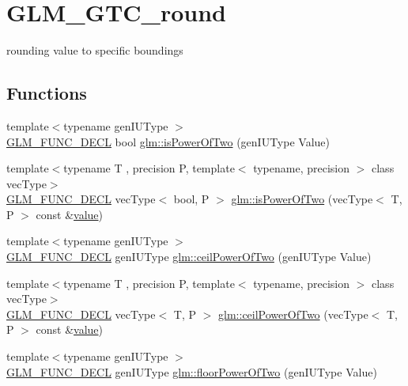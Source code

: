 \hypertarget{group__gtc__round}{}\section{G\+L\+M\+\_\+\+G\+T\+C\+\_\+round}
\label{group__gtc__round}


rounding value to specific boundings  


\subsection*{Functions}
\begin{DoxyCompactItemize}
\item 
{\footnotesize template$<$typename gen\+I\+U\+Type $>$ }\\\mbox{\hyperlink{setup_8hpp_ab2d052de21a70539923e9bcbf6e83a51}{G\+L\+M\+\_\+\+F\+U\+N\+C\+\_\+\+D\+E\+CL}} bool \mbox{\hyperlink{group__gtc__round_gaebf826fbb6e0a70eeaab0792d89b25ec}{glm\+::is\+Power\+Of\+Two}} (gen\+I\+U\+Type Value)
\item 
{\footnotesize template$<$typename T , precision P, template$<$ typename, precision $>$ class vec\+Type$>$ }\\\mbox{\hyperlink{setup_8hpp_ab2d052de21a70539923e9bcbf6e83a51}{G\+L\+M\+\_\+\+F\+U\+N\+C\+\_\+\+D\+E\+CL}} vec\+Type$<$ bool, P $>$ \mbox{\hyperlink{group__gtc__round_gad454e4c8d8cd73ddc7de855f733a1465}{glm\+::is\+Power\+Of\+Two}} (vec\+Type$<$ T, P $>$ const \&\mbox{\hyperlink{glad_8h_a03aff08f73d7fde3d1a08e0abd8e84fa}{value}})
\item 
{\footnotesize template$<$typename gen\+I\+U\+Type $>$ }\\\mbox{\hyperlink{setup_8hpp_ab2d052de21a70539923e9bcbf6e83a51}{G\+L\+M\+\_\+\+F\+U\+N\+C\+\_\+\+D\+E\+CL}} gen\+I\+U\+Type \mbox{\hyperlink{group__gtc__round_gaa73c7690c787086fa3ac1c312264acab}{glm\+::ceil\+Power\+Of\+Two}} (gen\+I\+U\+Type Value)
\item 
{\footnotesize template$<$typename T , precision P, template$<$ typename, precision $>$ class vec\+Type$>$ }\\\mbox{\hyperlink{setup_8hpp_ab2d052de21a70539923e9bcbf6e83a51}{G\+L\+M\+\_\+\+F\+U\+N\+C\+\_\+\+D\+E\+CL}} vec\+Type$<$ T, P $>$ \mbox{\hyperlink{group__gtc__round_ga76ec9b214ea1376fe09a903e34bab847}{glm\+::ceil\+Power\+Of\+Two}} (vec\+Type$<$ T, P $>$ const \&\mbox{\hyperlink{glad_8h_a03aff08f73d7fde3d1a08e0abd8e84fa}{value}})
\item 
{\footnotesize template$<$typename gen\+I\+U\+Type $>$ }\\\mbox{\hyperlink{setup_8hpp_ab2d052de21a70539923e9bcbf6e83a51}{G\+L\+M\+\_\+\+F\+U\+N\+C\+\_\+\+D\+E\+CL}} gen\+I\+U\+Type \mbox{\hyperlink{group__gtc__round_gac80f6519c31baae10d8d7bea6735d1fa}{glm\+::floor\+Power\+Of\+Two}} (gen\+I\+U\+Type Value)

\end{DoxyCompactItemize}
